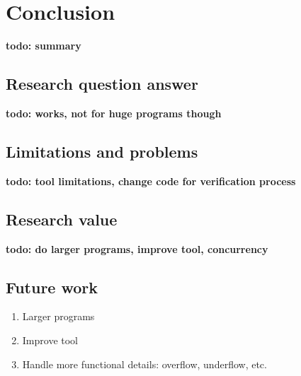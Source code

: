 \documentclass[a4paper]{article}
\newcommand{\todo}[1]{{\color{BurntOrange}\sffamily\textbf{todo: #1}\par}}
\begin{document}
\section{Conclusion}
\todo{summary}

\subsection{Research question answer}
\todo{works, not for huge programs though}

\subsection{Limitations and problems}
\todo{tool limitations, change code for verification process}

\subsection{Research value}
\todo{do larger programs, improve tool, concurrency}

\subsection{Future work}
\begin{enumerate}
	\item Larger programs
	\item Improve tool
	\item Handle more functional details: overflow, underflow, etc.
\end{enumerate}



\end{document}
